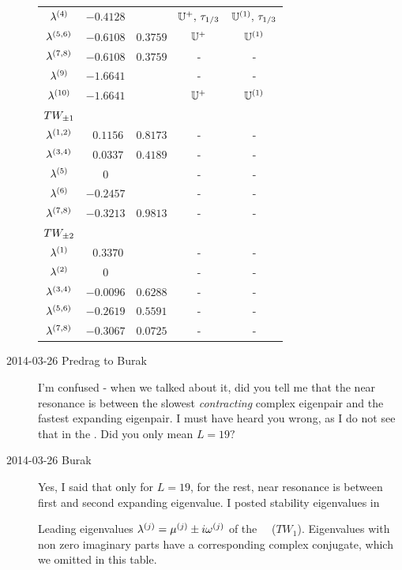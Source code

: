 \begin{description}
\begin{table}
\begin{center}
{\begin{tabular}{ccccc}
  $\eigExp[4]$   &$-0.4128$ &          & $\mathbb{U}^+,\,\tau_{1/3}$  & $\mathbb{U}^{(1)},\,\tau_{1/3}$\\
  $\eigExp[5,6]$ &$-0.6108$ & $0.3759$ & $\mathbb{U}^+$     & $\mathbb{U}^{(1)}$\\
  $\eigExp[7,8]$ &$-0.6108$ & $0.3759$ & -         & -\\
  $\eigExp[9]$   &$-1.6641$ &          & -         & -\\
  $\eigExp[10]$  &$-1.6641$ &          & $\mathbb{U}^+$     & $\mathbb{U}^{(1)}$ \\[2ex]
$TW_{\pm1}$&  &  & \\\hline
  $\eigExp[1,2]$ & $\ \ 0.1156$ & $0.8173$ & -  & -\\
  $\eigExp[3,4]$ & $\ \ 0.0337$ & $0.4189$ & -  & -\\
  $\eigExp[5]$   & $0$      &          & -  & -\\
  $\eigExp[6]$   &$-0.2457$ &          & -  & -\\
  $\eigExp[7,8]$ &$-0.3213$ & $0.9813$ & -  & -\\[2ex]
$TW_{\pm2}$&  &  & \\\hline
  $\eigExp[1]  $ & $\ \ 0.3370$ &          & -  & -\\
  $\eigExp[2]  $ & $0$      &          & -  & -\\
  $\eigExp[3,4]$ &$-0.0096$ & $0.6288$ & -  & -\\
  $\eigExp[5,6]$ &$-0.2619$ & $0.5591$ & -  & -\\
  $\eigExp[7,8]$ &$-0.3067$ & $0.0725$ & -  & -\\
\end{tabular}
    } %
\end{center}
\end{table}

\item[2014-03-26 Predrag to Burak] I'm confused - when we talked about
it, did you tell me that the near resonance is between the slowest
\emph{contracting} complex eigenpair and the fastest expanding eigenpair.
I must have heard you wrong, as I do not see that in the
. Did you only mean $L=19?$

\item[2014-03-26 Burak] Yes, I said that only for $L=19$, for the rest, near
resonance is between first and second expanding eigenvalue. I posted stability
eigenvalues in 

\begin{table}%
\caption{
Leading eigenvalues
$\eigExp[j]= \eigRe[j] \pm i\eigIm[j]$
of the \KS\ \reqv\ ($TW_1$).
Eigenvalues with non zero imaginary parts have a corresponding complex
conjugate, which we omitted in this table.
        }\label{t-tw1evals}


\end{table}
\end{description}
